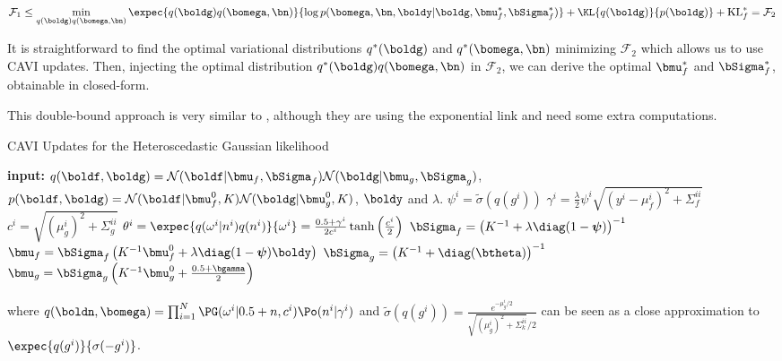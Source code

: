 \begin{align*}
    \mathcal{F}_1 \leq \min_{q(\boldg)q(\bomega,\bn)} \expec{q(\boldg)q(\bomega,\bn)}{\log p(\bomega,\bn,\boldy|\boldg,\bmu_f^*,\bSigma_f^*)} + \KL{q(\boldg)}{p(\boldg)} + \operatorname{KL}_f^*=\mathcal{F}_2
\end{align*}

It is straightforward to find the optimal variational distributions $q^*(\boldg)$ and $q^*(\bomega,\bn)$ minimizing $\mathcal{F}_2$ which allows us to use \ac{CAVI} updates.
Then, injecting the optimal distribution $q^*(\boldg)q(\bomega,\bn)$ in $\mathcal{F}_2$, we can derive the optimal $\bmu_f^*$ and $\bSigma_f^*$, obtainable in closed-form.

This double-bound approach is very similar to \citet{lazaro2011variational}, although they are using the exponential link and need some extra computations.

\begin{algorithm}[H]
    \caption{\ac{CAVI} Updates for the Heteroscedastic Gaussian likelihood}
    \begin{algorithmic}
        \State \textbf{input:} $q(\boldf,\boldg) = \mathcal{N}(\boldf|\bmu_f,\bSigma_f)\mathcal{N}(\boldg|\bmu_g,\bSigma_g)$, $p(\boldf,\boldg) = \mathcal{N}(\boldf|\bmu^0_f, K)\mathcal{N}(\boldg|\bmu^0_g, K)$, $\boldy$ and $\lambda$.
            \State $\psi^i = \widetilde{\sigma}(q(g^i))$
            \State $\gamma^i = \frac{\lambda}{2} \psi^i  \sqrt{(y^i - \mu_f^i)^2 + \Sigma_f^{ii}}$
            \State $c^i = \sqrt{(\mu_g^i)^2 + \Sigma^{ii}_g}$
            \State $\theta^i = \expec{q(\omega^i|n^i)q(n^i)}{\omega^i} = \frac{0.5 + \gamma^i}{2c^i}\tanh\left(\frac{c^i}{2}\right)$
            \State $\bSigma_f = \left(K^{-1} + \lambda\diag(1-\boldsymbol{\psi})\right)^{-1}$
            \State $\bmu_f = \bSigma_f\left(K^{-1}\bmu_f^0 + \lambda\diag(1 - \boldsymbol{\psi}) \boldy\right)$
            \State $\bSigma_g = \left(K^{-1} + \diag(\btheta)\right)^{-1}$
            \State $\bmu_g = \bSigma_g\left(K^{-1}\bmu_g^0 + \frac{0.5 + \bgamma}{2}\right)$
        \EndWhile
    \end{algorithmic}
    where $q(\boldn, \bomega) = \prod_{i=1}^N \PG(\omega^i|0.5 + n, c^i)\Po(n^i|\gamma^i)$ and $\widetilde{\sigma}(q(g^i)) = \frac{e^{-\mu_g^i/2}}{\sqrt{(\mu_g^i)^2 + \Sigma^{ii}_k} / 2}$ can be seen as a close approximation to $\expec{q(g^i)}{\sigma(-g^i)}$.
    \label{alg:cavi_hetero}
\end{algorithm}

